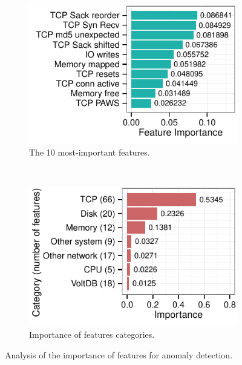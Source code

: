 \begin{figure}
        \centering
        \begin{subfigure}[b]{0.48\textwidth}
               \includegraphics[width=1\textwidth]{inputs/img/feature_importance}
                \caption{The 10 most-important features.}
                \label{fig:feature_importance}
        \end{subfigure}
        ~ %
        \begin{subfigure}[b]{0.48\textwidth}
                  \includegraphics[width=1\textwidth]{inputs/img/feature_importance_categories}
                \caption{Importance of features categories.}
                \label{fig:feature_importance_categories}
        \end{subfigure}
        \caption{Analysis of the importance of features for anomaly detection.}
        \label{fig:feature_importance_plots}
\end{figure}
